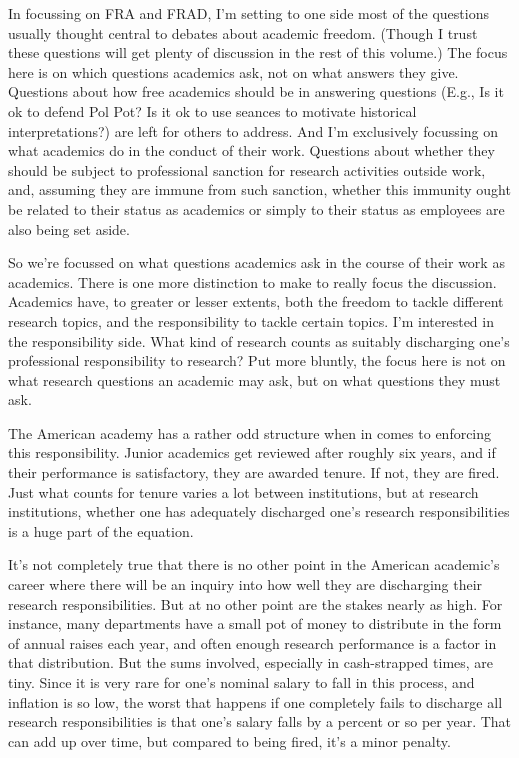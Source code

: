 \documentclass[
  10pt,
  letterpaper,
  DIV=11,
  numbers=noendperiod,
  twoside]{scrartcl}
\begin{document}
In focussing on FRA and FRAD, I'm setting to one side most of the
questions usually thought central to debates about academic freedom.
(Though I trust these questions will get plenty of discussion in the
rest of this volume.) The focus here is on which questions academics
ask, not on what answers they give. Questions about how free academics
should be in answering questions (E.g., Is it ok to defend Pol Pot? Is
it ok to use seances to motivate historical interpretations?) are left
for others to address. And I'm exclusively focussing on what academics
do in the conduct of their work. Questions about whether they should be
subject to professional sanction for research activities outside work,
and, assuming they are immune from such sanction, whether this immunity
ought be related to their status as academics or simply to their status
as employees are also being set aside.

So we're focussed on what questions academics ask in the course of their
work as academics. There is one more distinction to make to really focus
the discussion. Academics have, to greater or lesser extents, both the
freedom to tackle different research topics, and the responsibility to
tackle certain topics. I'm interested in the responsibility side. What
kind of research counts as suitably discharging one's professional
responsibility to research? Put more bluntly, the focus here is not on
what research questions an academic may ask, but on what questions they
must ask.

The American academy has a rather odd structure when in comes to
enforcing this responsibility. Junior academics get reviewed after
roughly six years, and if their performance is satisfactory, they are
awarded tenure. If not, they are fired. Just what counts for tenure
varies a lot between institutions, but at research institutions, whether
one has adequately discharged one's research responsibilities is a huge
part of the equation.

It's not completely true that there is no other point in the American
academic's career where there will be an inquiry into how well they are
discharging their research responsibilities. But at no other point are
the stakes nearly as high. For instance, many departments have a small
pot of money to distribute in the form of annual raises each year, and
often enough research performance is a factor in that distribution. But
the sums involved, especially in cash-strapped times, are tiny. Since it
is very rare for one's nominal salary to fall in this process, and
inflation is so low, the worst that happens if one completely fails to
discharge all research responsibilities is that one's salary falls by a
percent or so per year. That can add up over time, but compared to being
fired, it's a minor penalty.
\end{document}
